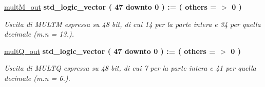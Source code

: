 \begin{DoxyCompactItemize}
\hyperlink{group___linear_regression_gae1fb15e247aa1abc0a406f879fbe6627}{mult\+M\+\_\+out} {\bfseries \textcolor{vhdlchar}{std\+\_\+logic\+\_\+vector}\textcolor{vhdlchar}{ }\textcolor{vhdlchar}{(}\textcolor{vhdlchar}{ }\textcolor{vhdlchar}{ } \textcolor{vhdldigit}{47} \textcolor{vhdlchar}{ }\textcolor{vhdlchar}{downto}\textcolor{vhdlchar}{ }\textcolor{vhdlchar}{ } \textcolor{vhdldigit}{0} \textcolor{vhdlchar}{ }\textcolor{vhdlchar}{)}\textcolor{vhdlchar}{ }\textcolor{vhdlchar}{ }\textcolor{vhdlchar}{ }\textcolor{vhdlchar}{\+:}\textcolor{vhdlchar}{=}\textcolor{vhdlchar}{ }\textcolor{vhdlchar}{(}\textcolor{vhdlchar}{ }\textcolor{vhdlchar}{ }\textcolor{vhdlchar}{others}\textcolor{vhdlchar}{ }\textcolor{vhdlchar}{ }\textcolor{vhdlchar}{=}\textcolor{vhdlchar}{ }\textcolor{vhdlchar}{$>$}\textcolor{vhdlchar}{ }\textcolor{vhdlchar}{\textquotesingle{}}\textcolor{vhdlchar}{ } \textcolor{vhdldigit}{0} \textcolor{vhdlchar}{ }\textcolor{vhdlchar}{\textquotesingle{}}\textcolor{vhdlchar}{ }\textcolor{vhdlchar}{)}\textcolor{vhdlchar}{ }} 
\begin{DoxyCompactList}\small\item\em Uscita di M\+U\+L\+TM espressa su 48 bit, di cui 14 per la parte intera e 34 per quella decimale (m.\+n = 13.). \end{DoxyCompactList}\item 
\hyperlink{group___linear_regression_gab45555807d57a057b5cd46161e28b6a5}{mult\+Q\+\_\+out} {\bfseries \textcolor{vhdlchar}{std\+\_\+logic\+\_\+vector}\textcolor{vhdlchar}{ }\textcolor{vhdlchar}{(}\textcolor{vhdlchar}{ }\textcolor{vhdlchar}{ } \textcolor{vhdldigit}{47} \textcolor{vhdlchar}{ }\textcolor{vhdlchar}{downto}\textcolor{vhdlchar}{ }\textcolor{vhdlchar}{ } \textcolor{vhdldigit}{0} \textcolor{vhdlchar}{ }\textcolor{vhdlchar}{)}\textcolor{vhdlchar}{ }\textcolor{vhdlchar}{ }\textcolor{vhdlchar}{ }\textcolor{vhdlchar}{\+:}\textcolor{vhdlchar}{=}\textcolor{vhdlchar}{ }\textcolor{vhdlchar}{(}\textcolor{vhdlchar}{ }\textcolor{vhdlchar}{ }\textcolor{vhdlchar}{others}\textcolor{vhdlchar}{ }\textcolor{vhdlchar}{ }\textcolor{vhdlchar}{=}\textcolor{vhdlchar}{ }\textcolor{vhdlchar}{$>$}\textcolor{vhdlchar}{ }\textcolor{vhdlchar}{\textquotesingle{}}\textcolor{vhdlchar}{ } \textcolor{vhdldigit}{0} \textcolor{vhdlchar}{ }\textcolor{vhdlchar}{\textquotesingle{}}\textcolor{vhdlchar}{ }\textcolor{vhdlchar}{)}\textcolor{vhdlchar}{ }} 
\begin{DoxyCompactList}\small\item\em Uscita di M\+U\+L\+TQ espressa su 48 bit, di cui 7 per la parte intera e 41 per quella decimale (m.\+n = 6.). \end{DoxyCompactList}\end{DoxyCompactItemize}

